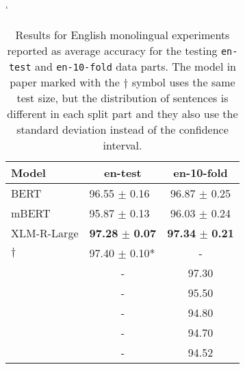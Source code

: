 \documentclass[10pt, a4paper]{article}
\begin{document}
\begin{table}[ht!]
\catcode`
\begin{adjustbox}{width=0.99\linewidth,center}
\begin{tabular}{llc} \toprule
Model                  & \multicolumn{1}{c}{en-test} & \multicolumn{1}{c}{en-10-fold} \\ \midrule
BERT             & 96.55 $\pm$ 0.16                 & 96.87 $\pm$ 0.25              \\
mBERT            & 95.87 $\pm$ 0.13                 & 96.03 $\pm$ 0.24              \\
XLM-R-Large            & \textbf{97.28} $\pm$ \textbf{0.07}                 & \textbf{97.34} $\pm$ \textbf{0.21}              \\ \hdashline
\cite{wang2021entailment-few-shot-learner}$\dagger$                    & \multicolumn{1}{l}{97.40 $\pm$ 0.10*}                         &  \multicolumn{1}{c}{-}                           \\

\cite{nandi2021empirical-indove-subj} &   \multicolumn{1}{c}{-}                              & 97.30                        \\

\cite{zhao2015self-adasent}               & \multicolumn{1}{c}{-}                              & \multicolumn{1}{c}{95.50}                        \\
\cite{CNN-MCFA-subj-2018}               &  \multicolumn{1}{c}{-}                              & \multicolumn{1}{c}{94.80}                        \\
\cite{khodak-etal-2018-la-byte-mLSTM7}            &  \multicolumn{1}{c}{-}                              & \multicolumn{1}{c}{94.70} \\

\cite{reimers-gurevych-2019-sentence}        &  \multicolumn{1}{c}{-}                              & \multicolumn{1}{c}{94.52} \\ 
\bottomrule                     
\end{tabular}
\end{adjustbox}
\caption{Results for English monolingual experiments reported as average accuracy for the testing \texttt{en-test} and \texttt{en-10-fold} data parts. The model in paper marked with the $\dagger$ symbol uses the same test size, but the distribution of sentences is different in each split part and they also use the standard deviation instead of the confidence interval.} \label{tab:monolingual-en}
\end{table}
\end{document}
